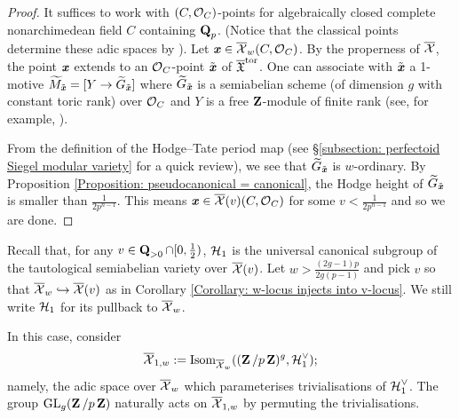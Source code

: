 \begin{proof}
It suffices to work with $(C, \operatorname{\mathcal{O}}_C)$-points for algebraically closed complete nonarchimedean field $C$ containing $\operatorname{\mathbf{Q}}_p$. (Notice that the classical points determine these adic spaces by \cite[(1.1.11)]{Huber-2013}). Let $\operatorname{\textbf{\textit{x}}}\in \overline{\operatorname{\mathcal{X}}}_w(C, \operatorname{\mathcal{O}}_C)$. By the properness of $\overline{\operatorname{\mathcal{X}}}$, the point $\operatorname{\textbf{\textit{x}}}$ extends to an $\operatorname{\mathcal{O}}_C$-point $\tilde{\operatorname{\textbf{\textit{x}}}}$ of $\overline{\operatorname{\mathfrak{X}}}^{\operatorname{tor}}$. One can associate with $\tilde{\operatorname{\textbf{\textit{x}}}}$ a 1-motive $\widetilde{M}_{\tilde{\operatorname{\textbf{\textit{x}}}}}=[Y\rightarrow \widetilde{G}_{\tilde{\operatorname{\textbf{\textit{x}}}}}]$ where $\widetilde{G}_{\tilde{\operatorname{\textbf{\textit{x}}}}}$ is a semiabelian scheme (of dimension $g$ with constant toric rank) over $\operatorname{\mathcal{O}}_C$ and $Y$ is a free $\operatorname{\mathbf{Z}}$-module of finite rank (see, for example, \cite{Stroh-TorComp}). 

From the definition of the Hodge--Tate period map (see \S \ref{subsection: perfectoid Siegel modular variety} for a quick review), we see that $\widetilde{G}_{\tilde{\operatorname{\textbf{\textit{x}}}}}$ is $w$-ordinary. By Proposition \ref{Proposition: pseudocanonical = canonical}, the Hodge height of $\widetilde{G}_{\tilde{\operatorname{\textbf{\textit{x}}}}}$ is smaller than $\frac{1}{2p^{n-1}}$. This means $\operatorname{\textbf{\textit{x}}}\in \overline{\operatorname{\mathcal{X}}}(v)(C, \operatorname{\mathcal{O}}_C)$ for some $v<\frac{1}{2p^{n-1}}$ and so we are done. %
\end{proof}

Recall that, for any $v\in \operatorname{\mathbf{Q}}_{>0}\cap [0, \frac{1}{2})$, $\operatorname{\mathcal{H}}_1$ is the universal canonical subgroup of the tautological semiabelian variety over $\overline{\operatorname{\mathcal{X}}}(v)$. Let $w>\frac{(2g-1)p}{2g(p-1)}$ and pick $v$ so that $\overline{\operatorname{\mathcal{X}}}_w\hookrightarrow \overline{\operatorname{\mathcal{X}}}(v)$ as in Corollary \ref{Corollary: w-locus injects into v-locus}. We still write $\operatorname{\mathcal{H}}_1$ for its pullback to $\overline{\operatorname{\mathcal{X}}}_w$.

In this case, consider
$$
   \overline{\operatorname{\mathcal{X}}}_{1, w} := \operatorname{Isom}_{\overline{\operatorname{\mathcal{X}}}_w}((\operatorname{\mathbf{Z}}/p\operatorname{\mathbf{Z}})^g, \operatorname{\mathcal{H}}_1^{\vee});
$$
namely, the adic space over $\overline{\operatorname{\mathcal{X}}}_w$ which parameterises trivialisations of $\operatorname{\mathcal{H}}_1^{\vee}$. The group $\operatorname{GL}_g(\operatorname{\mathbf{Z}}/p\operatorname{\mathbf{Z}})$ naturally acts on $\overline{\operatorname{\mathcal{X}}}_{1, w}$ by permuting the trivialisations.

